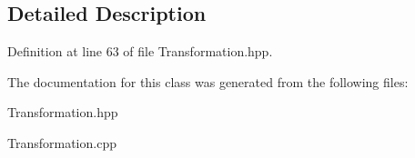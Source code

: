\subsection{Detailed Description}


Definition at line 63 of file Transformation.\-hpp.



The documentation for this class was generated from the following files\-:\begin{DoxyCompactItemize}
\item 
Transformation.\-hpp\item 
Transformation.\-cpp\end{DoxyCompactItemize}
